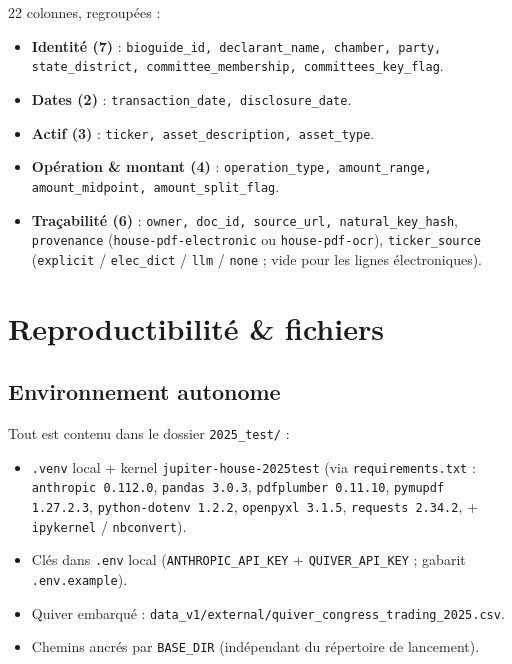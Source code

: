 \documentclass[11pt,a4paper]{article}
\newcommand{\file}[1]{\texttt{\small #1}}
\begin{document}
22 colonnes, regroupées :
\begin{itemize}\raggedright
  \item \textbf{Identité (7)} : \texttt{bioguide\_id, declarant\_name, chamber, party,
        state\_district, committee\_membership, committees\_key\_flag}.
  \item \textbf{Dates (2)} : \texttt{transaction\_date, disclosure\_date}.
  \item \textbf{Actif (3)} : \texttt{ticker, asset\_description, asset\_type}.
  \item \textbf{Opération \& montant (4)} : \texttt{operation\_type, amount\_range,
        amount\_midpoint, amount\_split\_flag}.
  \item \textbf{Traçabilité (6)} : \texttt{owner, doc\_id, source\_url, natural\_key\_hash},
        \texttt{provenance} (\texttt{house-pdf-electronic} ou \texttt{house-pdf-ocr}),
        \texttt{ticker\_source} (\texttt{explicit} / \texttt{elec\_dict} / \texttt{llm} /
        \texttt{none} ; vide pour les lignes électroniques).
\end{itemize}

\section{Reproductibilité \& fichiers}

\subsection*{Environnement autonome}
Tout est contenu dans le dossier \file{2025\_test/} :
\begin{itemize}\raggedright
  \item \file{.venv} local + kernel \texttt{jupiter-house-2025test} (via \file{requirements.txt} :
        \texttt{anthropic 0.112.0}, \texttt{pandas 3.0.3}, \texttt{pdfplumber 0.11.10},
        \texttt{pymupdf 1.27.2.3}, \texttt{python-dotenv 1.2.2}, \texttt{openpyxl 3.1.5},
        \texttt{requests 2.34.2}, + \texttt{ipykernel} / \texttt{nbconvert}).
  \item Clés dans \file{.env} local (\texttt{ANTHROPIC\_API\_KEY} + \texttt{QUIVER\_API\_KEY} ;
        gabarit \file{.env.example}).
  \item Quiver embarqué : \file{data\_v1/external/quiver\_congress\_trading\_2025.csv}.
  \item Chemins ancrés par \texttt{BASE\_DIR} (indépendant du répertoire de lancement).
\end{itemize}
\end{document}
